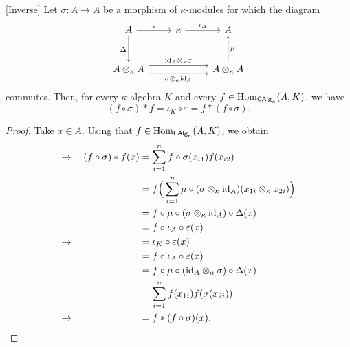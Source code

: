 \begin{lem}\label{lem:*-inverse} {\rm[Inverse]}
    Let $\sigma\colon A\to A$ be a morphism of $\kappa$-modules for which
    the diagram
    \small
    $$
        \begin{tikzcd}[row sep=large]
            A
                    \arrow[d,"\Delta"']
                    \arrow[r,"\varepsilon"]
                &\kappa
                    \arrow[r,"\iota_A"]
                &A\\
            A\otimes_\kappa A
                    \arrow[rr,"\id_A\otimes_\kappa\sigma",
                        start anchor={[yshift=1ex]},
                        end anchor={[yshift=1ex]}]
                    \arrow[rr,"\sigma\otimes_\kappa\id_A"',
                        start anchor={[yshift=-1ex]},
                        end anchor={[yshift=-1ex]}]
                &&A\otimes_\kappa A
                    \arrow[u,"\mu"']
        \end{tikzcd}
    $$
    \normalsize
    commutes. Then, for every $\kappa$-algebra $K$ and every $f\in{\rm Hom}_{\mathsf{CAlg}_\kappa}(A,K)$, we have
    $$
        (f\circ\sigma)*f=\iota_K\circ\varepsilon=f*(f\circ\sigma).
    $$
\end{lem}

\begin{proof}
    Take $x\in A$. Using that $f\in{\rm Hom}_{\mathsf{CAlg}_\kappa}(A,K)$, we obtain
    \begin{align*}
        \to\quad (f\circ\sigma)*f(x)
            &= \sum_{i=1}^nf\circ\sigma(x_{i1})f(x_{i2})\\
            &= f\Big(\sum_{i=1}^n
                \mu\circ(\sigma\otimes_\kappa \text{\rm id}_A)(x_{1i}\otimes_\kappa x_{2i})\Big)\\
            &= f\circ\mu\circ(\sigma\otimes_\kappa\text{\rm id}_A)\circ\Delta(x)\\
            &= f\circ\iota_A\circ\varepsilon(x)\\
        \to\quad\hphantom{(f\circ\sigma)*f(x)}
            &= \iota_K\circ\varepsilon(x)\\
            &= f\circ\iota_A\circ\varepsilon(x)\\
            &= f\circ\mu\circ(\text{\rm id}_A\otimes_\kappa\sigma)\circ\Delta(x)\\
            &= \sum_{i=1}^nf(x_{1i})f(\sigma(x_{2i}))\\
        \to\quad\hphantom{(f\circ\sigma)*f(x)}
            &= f*(f\circ\sigma)(x).
    \end{align*}
    \normalsize
\end{proof}

